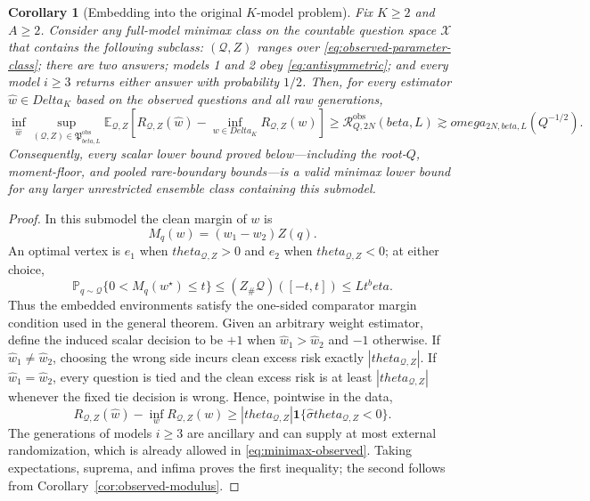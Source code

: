 \documentclass[11pt]{article}
\def\beta{beta}%
\def\theta{theta}%
\def\omega{omega}%
\def\Delta{Delta}%
\newtheorem{corollary}[theorem]{Corollary}
\newcommand{\Pp}{\mathbb P}
\newcommand{\E}{\mathbb E}
\newcommand{\one}{\mathbf 1}
\newcommand{\calQ}{\mathcal Q}
\newcommand{\calR}{\mathcal R}
\begin{document}
\begin{corollary}[Embedding into the original $K$-model problem]
\label{cor:general-lower-transfer}
Fix $K\ge2$ and $A\ge2$.  Consider any full-model minimax class on the countable question space $\mathcal X$ that contains the following subclass: $(\calQ,Z)$ ranges over \eqref{eq:observed-parameter-class}; there are two answers; models 1 and 2 obey \eqref{eq:antisymmetric}; and every model $i\ge3$ returns either answer with probability $1/2$.  Then, for every estimator $\widehat w\in\Delta_K$ based on the observed questions and all raw generations,
\begin{equation}
\label{eq:general-lower-transfer}
\inf_{\widehat w}
\sup_{(\calQ,Z)\in\mathfrak P^{\mathrm{obs}}_{\beta,L}}
\E_{\calQ,Z}\!\left[
R_{\calQ,Z}(\widehat w)-\inf_{w\in\Delta_K}R_{\calQ,Z}(w)
\right]
\ge
\calR^{\mathrm{obs}}_{Q,2N}(\beta,L)
\gtrsim
\omega_{2N,\beta,L}(Q^{-1/2}).
\end{equation}
Consequently, every scalar lower bound proved below---including the root-$Q$, moment-floor, and pooled rare-boundary bounds---is a valid minimax lower bound for any larger unrestricted ensemble class containing this submodel.
\end{corollary}

\begin{proof}
In this submodel the clean margin of $w$ is
\[
M_q(w)=(w_1-w_2)Z(q).
\]
An optimal vertex is $e_1$ when $\theta_{\calQ,Z}>0$ and $e_2$ when $\theta_{\calQ,Z}<0$; at either choice,
\[
\Pp_{q\sim\calQ}\{0<M_q(w^\star)\le t\}
\le
(Z_\#\calQ)([-t,t])
\le Lt^\beta.
\]
Thus the embedded environments satisfy the one-sided comparator margin condition used in the general theorem.  Given an arbitrary weight estimator, define the induced scalar decision to be $+1$ when $\widehat w_1>\widehat w_2$ and $-1$ otherwise.  If $\widehat w_1\ne\widehat w_2$, choosing the wrong side incurs clean excess risk exactly $|\theta_{\calQ,Z}|$.  If $\widehat w_1=\widehat w_2$, every question is tied and the clean excess risk is at least $|\theta_{\calQ,Z}|$ whenever the fixed tie decision is wrong.  Hence, pointwise in the data,
\[
R_{\calQ,Z}(\widehat w)-\inf_wR_{\calQ,Z}(w)
\ge
|\theta_{\calQ,Z}|\one\{\widehat\sigma\theta_{\calQ,Z}<0\}.
\]
The generations of models $i\ge3$ are ancillary and can supply at most external randomization, which is already allowed in \eqref{eq:minimax-observed}.  Taking expectations, suprema, and infima proves the first inequality; the second follows from Corollary~\ref{cor:observed-modulus}.
\end{proof}
\end{document}
